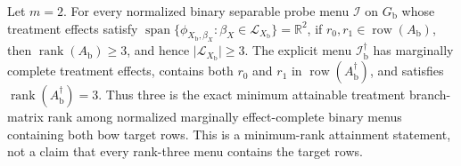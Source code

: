 Let \(m=2\).  For every normalized binary separable probe menu \(\mathcal I\)
on \(G_{\mathrm b}\) whose treatment effects satisfy
\(\operatorname{span}\{\phi_{X_{\mathrm b},\beta_X}:\beta_X\in
\mathcal L_{X_{\mathrm b}}\}=\mathbb R^2\), if
\(r_0,r_1\in\operatorname{row}(A_{\mathrm b})\), then
\(\operatorname{rank}(A_{\mathrm b})\geq 3\), and hence
\(\lvert\mathcal L_{X_{\mathrm b}}\rvert\geq3\).  The explicit menu
\(\mathcal I_{\mathrm b}^{\dagger}\) has marginally complete treatment
effects, contains both \(r_0\) and \(r_1\) in
\(\operatorname{row}(A_{\mathrm b}^{\dagger})\), and satisfies
\(\operatorname{rank}(A_{\mathrm b}^{\dagger})=3\).  Thus three is the exact
minimum attainable treatment branch-matrix rank among normalized marginally
effect-complete binary menus containing both bow target rows.  This is a
minimum-rank attainment statement, not a claim that every rank-three menu
contains the target rows.